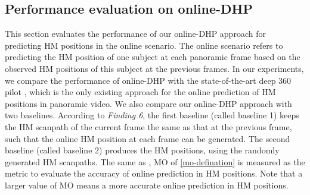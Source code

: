 \documentclass[10pt,journal,compsoc]{IEEEtran}
\begin{document}

\subsection{Performance evaluation on online-DHP}\label{sec:evaluation_online}
\label{online-compare}




This section evaluates the performance of our online-DHP approach for predicting HM positions in the online scenario.
The online scenario refers to predicting the HM position of one subject at each panoramic frame based on the observed HM positions of this subject at the previous frames.
In our experiments, we compare the performance of online-DHP with the state-of-the-art deep 360 pilot \cite{hu2017deep}, which is the only existing approach for the online prediction of HM positions in panoramic video.
We also compare our online-DHP approach with two baselines. According to \textit{Finding 6}, the first baseline (called baseline 1) keeps the HM scanpath of the current frame the same as that at the previous frame, such that the online HM position at each frame can be generated.
The second baseline (called baseline 2) produces the HM positions, using the randomly generated HM scanpaths. The same as \cite{hu2017deep}, MO of \eqref{mo-defination} is measured as the metric to evaluate the accuracy of online prediction in HM positions. Note that a larger value of MO means a more accurate online prediction in HM positions.
\end{document}
